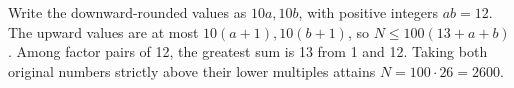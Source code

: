 Write the downward-rounded values as $10a,10b$, with positive integers $ab=12$. The upward values are at most $10(a+1),10(b+1)$, so $N\le100(13+a+b)$. Among factor pairs of 12, the greatest sum is 13 from 1 and 12. Taking both original numbers strictly above their lower multiples attains $N=100\cdot26=\boxed{2600}$.

